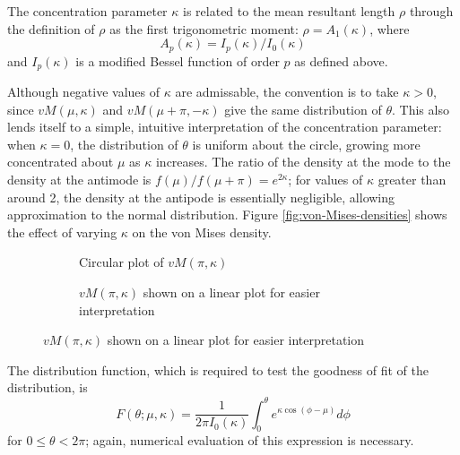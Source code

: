 \documentclass[../../ArchStats.tex]{subfiles}
\begin{document}
The concentration parameter $\kappa$ is related to the mean resultant length $\rho$ through the definition of $\rho$ as the first  trigonometric moment: $\rho = A_1(\kappa)$, where
\[A_p(\kappa) = I_p(\kappa)/I_0(\kappa)\]
and $I_p(\kappa)$ is a modified Bessel function of order $p$ as defined above.

Although negative values of $\kappa$ are admissable, the convention is to take $\kappa > 0$, since $vM(\mu, \kappa)$ and $vM(\mu + \pi, -\kappa)$ give the same distribution of $\theta$. This also lends itself to a simple, intuitive interpretation of the concentration parameter: when $\kappa = 0$, the distribution of $\theta$ is uniform about the circle, growing more concentrated about $\mu$ as $\kappa$ increases.  The ratio of the density at the mode to the density at the antimode is $f(\mu) / f(\mu + \pi) = e^{2\kappa}$; for values of $\kappa$ greater than around 2, the density at the antipode is essentially negligible, allowing approximation to the normal distribution. Figure \ref{fig:von-Mises-densities} shows the effect of varying $\kappa$ on the von Mises density.
 
\begin{figure}[!h]
\centering
\caption{von Mises densities with varying $\kappa$; $\mu = \pi$}
\label{fig:von-Mises-densities}
%
\begin{subfigure}[t]{0.45\textwidth}
\caption{Circular plot of $vM(\pi, \kappa)$}
\end{subfigure}
%
\begin{subfigure}[t]{0.45\textwidth}
\caption{$vM(\pi, \kappa)$ shown on a linear plot for easier interpretation}
\end{subfigure}
%
\end{figure}


The distribution function, which is required to test the goodness of fit of the distribution, is
\[F(\theta; \mu, \kappa) = \frac{1}{2\pi I_0(\kappa)} \int_0^\theta e^{\kappa \cos(\phi - \mu)}d\phi\]
for $0 \leq \theta < 2\pi$; again, numerical evaluation of this expression is necessary.
 
\end{document}
